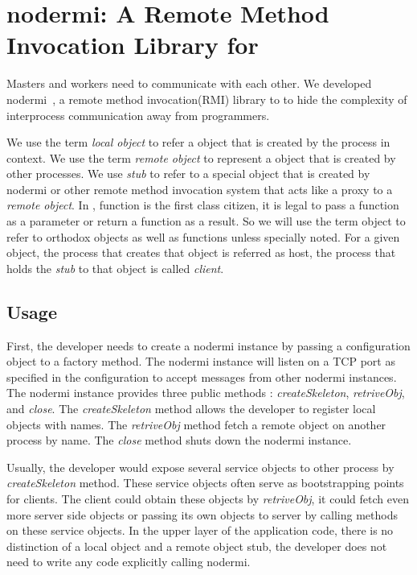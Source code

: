 \chapter{nodermi: A Remote Method Invocation Library for \nodejs{}}

Masters and workers need to communicate with each other.
We developed nodermi~\cite{nodermi}, a remote method invocation(RMI) library to
to hide the complexity of interprocess communication away from
programmers.

We use the term \emph{local object}
to refer a object that is created by the process in context.
We use the term \emph{remote object} to represent a object that is
created by other processes.
We use \emph{stub} to refer to a special object that is created
by nodermi or other remote method invocation system that
acts like a proxy to a \emph{remote object}.
In \js{}, function is the first class citizen, it is legal
to pass a function as a parameter or return a function as a result.
So we will use the term object to refer to orthodox objects as well as
functions unless specially noted.
For a given object, the process that creates that object is referred 
as host, the process that holds the \emph{stub} to that object is called \emph{client}.


\section{Usage}
First, the developer needs to create a nodermi instance by passing a configuration
object to a factory method.
The nodermi instance will listen on a TCP port as specified in the configuration
to accept messages from other nodermi instances.
The nodermi instance provides three public methods : \emph{createSkeleton},
\emph{retriveObj}, and \emph{close}.
The \emph{createSkeleton} method allows the developer to register local objects
with names.
The \emph{retriveObj} method fetch a remote object on another process by name.
The \emph{close} method shuts down the nodermi instance.

Usually, the developer would expose several service objects to other process
by \emph{createSkeleton} method.
These service objects often serve as bootstrapping points for clients.
The client could obtain these objects by \emph{retriveObj},
it could fetch even more server side objects or passing its own objects to server
by calling methods on these service objects.
In the upper layer of the application code,
there is no distinction of a local object and a remote object stub,
the developer does not need to write any code explicitly calling nodermi.

